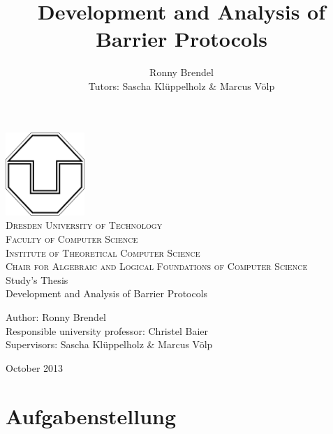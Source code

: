 \documentclass[a4paper, 10pt]{article}
\title{Development and Analysis of Barrier Protocols}
\author{Ronny Brendel\\Tutors: Sascha Kl\"uppelholz \& Marcus V\"olp}
\begin{document}

\begin{titlepage}

\begin{center}
\includegraphics[width=3cm]{tu-logo}~\\[1cm]
\textsc{\LARGE Dresden University of Technology}\\[0.5cm]
\textsc{\Large Faculty of Computer Science}\\[0.2cm]
\textsc{\large Institute of Theoretical Computer Science}\\[0.2cm]
\textsc{\large Chair for Algebraic and Logical Foundations of Computer Science}\\[3cm]
\Huge Study's Thesis \\[1cm]
\huge Development and Analysis of Barrier Protocols\\[3cm]
\end{center}

\begin{flushleft} \large
	Author: Ronny Brendel \\
	Responsible university professor: Christel Baier \\
	Supervisors: Sascha Kl\"uppelholz \& Marcus V\"olp
\end{flushleft}

\vfill
\begin{flushright}
	\large October 2013
\end{flushright}

\end{titlepage}

\pagebreak
\newpage \thispagestyle{empty} \mbox{}
\pagebreak

\section*{Aufgabenstellung}

\pagebreak
\newpage \thispagestyle{empty} \mbox{}
\pagebreak

\end{document}
